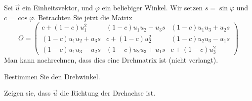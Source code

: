 Sei $\vec u$ ein Einheitsvektor, und $\varphi$ ein beliebiger Winkel.
Wir setzen $s=\sin\varphi$ und $c=\cos\varphi$. Betrachten Sie jetzt
die Matrix
\[
O=\begin{pmatrix}
c+(1-c)u_1^2    &(1-c)u_1u_2-u_3s   &(1-c)u_1u_3+u_2s\\
(1-c)u_1u_2+u_3s&c+(1-c)u_2^2       &(1-c)u_2u_3-u_1s\\
(1-c)u_1u_3-u_2s&(1-c)u_2u_3+u_1s   &c+(1-c)u_3^2
\end{pmatrix}
\]
Man kann nachrechnen, dass dies eine Drehmatrix ist (nicht verlangt).
\begin{teilaufgaben}
\item Bestimmen Sie den Drehwinkel.
\item Zeigen sie, dass $\vec u$ die Richtung der Drehachse ist.
\end{teilaufgaben}

